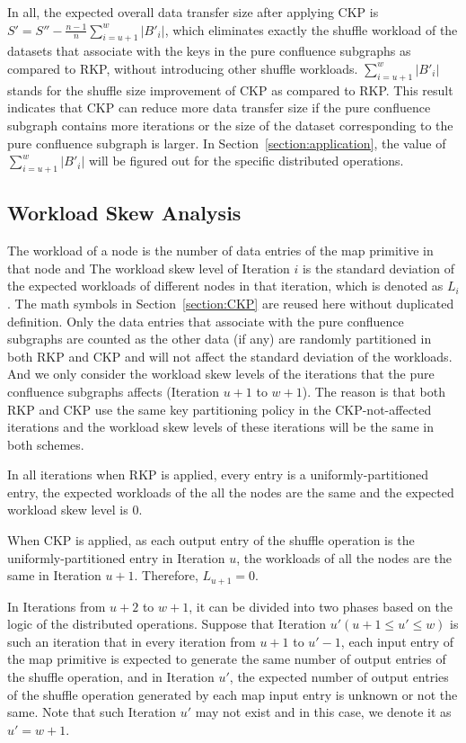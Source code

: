\documentclass[10pt,journal,compsoc]{IEEEtran}
\begin{document}
In all, the expected overall data transfer size after applying CKP 
is $S'=S''- \frac{n-1}{n}\sum_{i=u+1}^w |B'_i|$, 
which eliminates exactly the shuffle workload of the datasets that associate with the keys in the pure confluence subgraphs as compared to RKP, without introducing other shuffle workloads. 
$\sum_{i=u+1}^w |B'_i|$ stands for the shuffle size improvement of CKP as compared to RKP.
This result indicates that CKP can reduce more data transfer size 
if the pure confluence subgraph contains more iterations 
or the size of the dataset corresponding to the pure confluence subgraph is larger. 
In Section~\ref{section:application}, the value of $\sum_{i=u+1}^w |B'_i|$ will be figured out for the specific distributed operations.


\subsection{Workload Skew Analysis}\label{section:skew}
The workload of a node is the number of data entries of the map primitive in that node and 
The workload skew level of Iteration $i$ is the standard deviation of the expected workloads of different nodes in that iteration, which is denoted as $L_i$. 
The math symbols in Section~\ref{section:CKP} are reused here without duplicated definition. 
Only the data entries that associate with the pure confluence subgraphs are counted as the other data (if any) are randomly partitioned in both RKP and CKP and will not affect the standard deviation of the workloads.
And we only consider the workload skew levels of the iterations that the pure confluence subgraphs affects (Iteration $u+1$ to $w+1$).
The reason is that both RKP and CKP use the same key partitioning policy in the CKP-not-affected iterations and the workload skew levels of these iterations will be the same in both schemes.


In all iterations when RKP is applied, every entry is a uniformly-partitioned entry, the expected workloads of the all the nodes are the same and the expected workload skew level is 0. 

When CKP is applied, as each output entry of the shuffle operation is the uniformly-partitioned entry in Iteration $u$, the workloads of all the nodes are the same in Iteration $u+1$. 
Therefore, $L_{u+1}=0$.

In Iterations from $u+2$ to $w+1$, 
it can be divided into two phases based on the logic of the distributed operations. 
Suppose that Iteration $u' (u+1 \leq u' \leq w)$ is such an iteration that in every iteration from $u+1$ to $u'-1$, each input entry of the map primitive is expected to generate the same number of output entries of the shuffle operation, and in Iteration $u'$, the expected number of output entries of the shuffle operation generated by each map input entry is unknown or not the same. 
Note that such Iteration $u'$ may not exist and in this case, we denote it as $u'=w+1$. 
\end{document}
